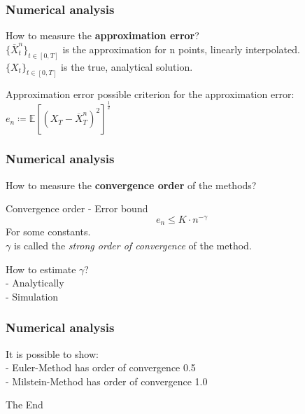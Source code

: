 \begin{frame}
\frametitle{Numerical analysis}
How to measure the \textbf{approximation error}?\\
\(\{\overline{X}^n_{t}\}_{t\in[0,T]}\) is the approximation for n points, linearly interpolated.\\
\(\{X_{t}\}_{t\in[0,T]}\) is the true, analytical solution.\\
\begin{block}{Approximation error}
possible criterion for the approximation error:\\
\(e_n\coloneqq\mathbb{E}[(X_T - \overline{X}^n_{T})^2]^{\frac{1}{2}}\quad\)
\end{block}
\end{frame}

\begin{frame}
\frametitle{Numerical analysis}
How to measure the \textbf{convergence order} of the methods?\\
\begin{block}{Convergence order - Error bound}
\[e_n \leq K\cdot n^{-\gamma}\]
For some constants.\\
\(\gamma\) is called the \emph{strong order of convergence} of the method.
\end{block}

How to estimate \(\gamma\)?\\
- Analytically\\
- Simulation\\

\end{frame}


\begin{frame}
\frametitle{Numerical analysis}

It is possible to show:\\
- Euler-Method has order of convergence 0.5\\
- Milstein-Method has order of convergence 1.0\\

\end{frame}



\begin{frame}
\Huge{\centerline{The End}}
\end{frame}

